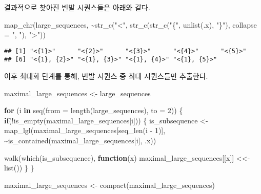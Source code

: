 \documentclass[
]{book}
\newenvironment{Shaded}{\begin{snugshade}}{\end{snugshade}}
\newcommand{\AttributeTok}[1]{\textcolor[rgb]{0.77,0.63,0.00}{#1}}
\newcommand{\ControlFlowTok}[1]{\textcolor[rgb]{0.13,0.29,0.53}{\textbf{#1}}}
\newcommand{\DecValTok}[1]{\textcolor[rgb]{0.00,0.00,0.81}{#1}}
\newcommand{\FunctionTok}[1]{\textcolor[rgb]{0.00,0.00,0.00}{#1}}
\newcommand{\NormalTok}[1]{#1}
\newcommand{\OtherTok}[1]{\textcolor[rgb]{0.56,0.35,0.01}{#1}}
\newcommand{\SpecialCharTok}[1]{\textcolor[rgb]{0.00,0.00,0.00}{#1}}
\newcommand{\StringTok}[1]{\textcolor[rgb]{0.31,0.60,0.02}{#1}}
\begin{document}
결과적으로 찾아진 빈발 시퀀스들은 아래와 같다.

\begin{Shaded}
\begin{Highlighting}[]
\FunctionTok{map\_chr}\NormalTok{(large\_sequences, }
    \SpecialCharTok{\textasciitilde{}}\FunctionTok{str\_c}\NormalTok{(}\StringTok{"\textless{}"}\NormalTok{, }\FunctionTok{str\_c}\NormalTok{(}\FunctionTok{str\_c}\NormalTok{(}\StringTok{"\{"}\NormalTok{, }\FunctionTok{unlist}\NormalTok{(.x), }\StringTok{"\}"}\NormalTok{), }\AttributeTok{collapse =} \StringTok{", "}\NormalTok{), }\StringTok{"\textgreater{}"}\NormalTok{))}
\end{Highlighting}
\end{Shaded}

\begin{verbatim}
## [1] "<{1}>"      "<{2}>"      "<{3}>"      "<{4}>"      "<{5}>"     
## [6] "<{1}, {2}>" "<{1}, {3}>" "<{1}, {4}>" "<{1}, {5}>"
\end{verbatim}

이후 최대화 단계를 통해, 빈발 시퀀스 중 최대 시퀀스들만 추출한다.

\begin{Shaded}
\begin{Highlighting}[]
\NormalTok{maximal\_large\_sequences }\OtherTok{\textless{}{-}}\NormalTok{ large\_sequences}

\ControlFlowTok{for}\NormalTok{ (i }\ControlFlowTok{in} \FunctionTok{seq}\NormalTok{(}\AttributeTok{from =} \FunctionTok{length}\NormalTok{(large\_sequences), }\AttributeTok{to =} \DecValTok{2}\NormalTok{)) \{}
  \ControlFlowTok{if}\NormalTok{(}\SpecialCharTok{!}\FunctionTok{is\_empty}\NormalTok{(maximal\_large\_sequences[i])) \{}
\NormalTok{    is\_subsequence }\OtherTok{\textless{}{-}} \FunctionTok{map\_lgl}\NormalTok{(maximal\_large\_sequences[}\FunctionTok{seq\_len}\NormalTok{(i }\SpecialCharTok{{-}} \DecValTok{1}\NormalTok{)],}
                              \SpecialCharTok{\textasciitilde{}}\FunctionTok{is\_contained}\NormalTok{(maximal\_large\_sequences[i], .x))}
    
    \FunctionTok{walk}\NormalTok{(}\FunctionTok{which}\NormalTok{(is\_subsequence), }\ControlFlowTok{function}\NormalTok{(x) maximal\_large\_sequences[[x]] }\OtherTok{\textless{}\textless{}{-}} \FunctionTok{list}\NormalTok{())}
\NormalTok{  \}}
\NormalTok{\}}

\NormalTok{maximal\_large\_sequences }\OtherTok{\textless{}{-}} \FunctionTok{compact}\NormalTok{(maximal\_large\_sequences)}
\end{Highlighting}
\end{Shaded}
\end{document}
